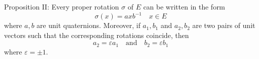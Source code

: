 Proposition II: Every proper rotation $\sigma$ of $E$ can be written in the form
$$\sigma(x) = a x b^{-1} \quad x \in E$$
where $a, b$ are unit quaternions. Moreover, if $a_1, b_1$ and $a_2, b_2$ are two pairs of unit vectors such that the corresponding rotations coincide, then
$$a_2 = \varepsilon a_1 \quad \text{and} \quad b_2 = \varepsilon b_1$$
where $\varepsilon = \pm 1$.
